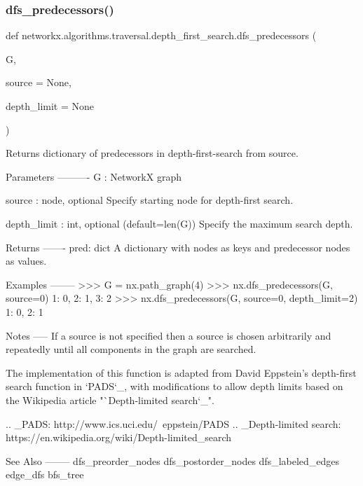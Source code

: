 \subsubsection{\texorpdfstring{dfs\+\_\+predecessors()}{dfs\_predecessors()}}
{\footnotesize\ttfamily def networkx.\+algorithms.\+traversal.\+depth\+\_\+first\+\_\+search.\+dfs\+\_\+predecessors (\begin{DoxyParamCaption}\item[{}]{G,  }\item[{}]{source = {\ttfamily None},  }\item[{}]{depth\+\_\+limit = {\ttfamily None} }\end{DoxyParamCaption})}

\begin{DoxyVerb}Returns dictionary of predecessors in depth-first-search from source.

Parameters
----------
G : NetworkX graph

source : node, optional
   Specify starting node for depth-first search.

depth_limit : int, optional (default=len(G))
   Specify the maximum search depth.

Returns
-------
pred: dict
   A dictionary with nodes as keys and predecessor nodes as values.

Examples
--------
>>> G = nx.path_graph(4)
>>> nx.dfs_predecessors(G, source=0)
{1: 0, 2: 1, 3: 2}
>>> nx.dfs_predecessors(G, source=0, depth_limit=2)
{1: 0, 2: 1}

Notes
-----
If a source is not specified then a source is chosen arbitrarily and
repeatedly until all components in the graph are searched.

The implementation of this function is adapted from David Eppstein's
depth-first search function in `PADS`_, with modifications
to allow depth limits based on the Wikipedia article
"`Depth-limited search`_".

.. _PADS: http://www.ics.uci.edu/~eppstein/PADS
.. _Depth-limited search: https://en.wikipedia.org/wiki/Depth-limited_search

See Also
--------
dfs_preorder_nodes
dfs_postorder_nodes
dfs_labeled_edges
edge_dfs
bfs_tree
\end{DoxyVerb}
 \mbox{\label{namespacenetworkx_1_1algorithms_1_1traversal_1_1depth__first__search_a637cdd3af5e497cd1e7b1e57a0b50f4f}} 
